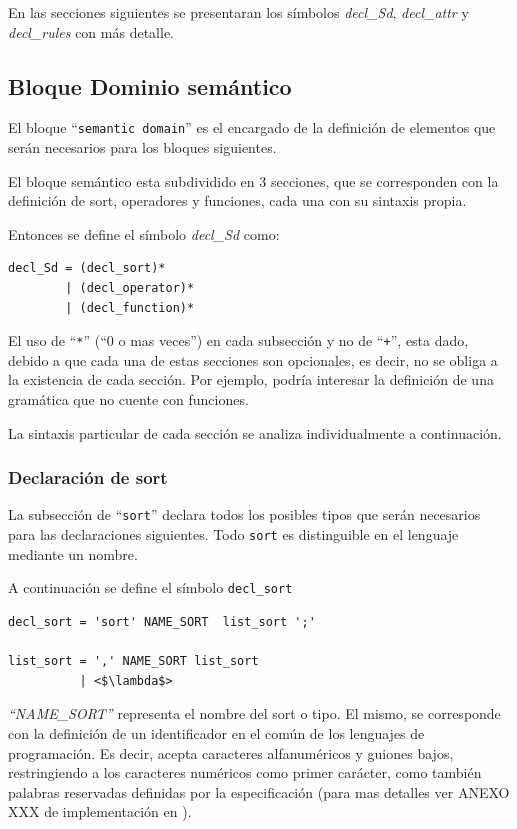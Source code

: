 En las secciones siguientes se presentaran los símbolos \textit{decl\_Sd}, \textit{decl\_attr} y \textit{decl\_rules} con más detalle.  

\subsection{Bloque Dominio semántico}

El bloque ``\texttt{semantic domain}'' es el encargado de la definición de elementos que serán necesarios para los bloques siguientes. 

El bloque semántico esta subdividido en 3 secciones, que se corresponden con la definición de sort, operadores y funciones, cada una con su sintaxis propia. 

Entonces se define el símbolo \textit{decl\_Sd} como:

\begin{lstlisting}[frame=shadowbox, rulesepcolor=\color{blue},language=inform,linewidth=10cm]
decl_Sd = (decl_sort)*
        | (decl_operator)*
        | (decl_function)*
\end{lstlisting}

El uso de ``\texttt{*}'' (``0 o mas veces'') en cada subsección y no de ``\texttt{+}'', esta dado, debido a que cada una de estas secciones son opcionales, es decir, no se obliga a la existencia de cada sección. Por ejemplo, podría interesar la definición de una gramática que no cuente con funciones.

La sintaxis particular de cada sección se analiza individualmente a continuación.

\subsubsection{Declaración de sort}
La subsección de ``\texttt{sort}'' declara todos los posibles tipos que serán necesarios para las declaraciones siguientes. Todo \texttt{sort} es distinguible en el lenguaje mediante un nombre.

A continuación se define el símbolo \texttt{decl\_sort}

\begin{lstlisting}[escapeinside=<>, frame=shadowbox, rulesepcolor=\color{blue},language=inform, linewidth=10cm]
decl_sort = 'sort' NAME_SORT  list_sort ';'

list_sort = ',' NAME_SORT list_sort
          | <$\lambda$> 
\end{lstlisting}

\textit{``NAME\_SORT''} representa el nombre del sort o tipo. El mismo, se corresponde con la definición de un identificador en el común de los lenguajes de programación. Es decir, acepta caracteres alfanuméricos y guiones bajos, restringiendo a los caracteres numéricos como primer carácter, como también palabras reservadas definidas por la especificación (para mas detalles ver ANEXO  XXX de implementación en \spirit).\\

